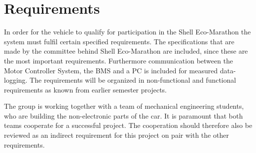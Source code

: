 \chapter{Requirements}
\label{sec:requirements}
In order for the vehicle to qualify for participation in the Shell Eco-Marathon the system must fulfil certain specified requirements. The specifications that are made by the committee behind Shell Eco-Marathon are included, since these are the most important requirements. Furthermore communication between the Motor Controller System, the BMS and a PC is included for measured data-logging. The requirements will be organized in non-functional and functional requirements as known from earlier semester projects.

The group is working together with a team of mechanical engineering students, who are building the non-electronic parts of the car. It is paramount that both teams cooperate for a successful project. The cooperation should therefore also be reviewed as an indirect requirement for this project on pair with the other requirements.


\pagebreak

\pagebreak